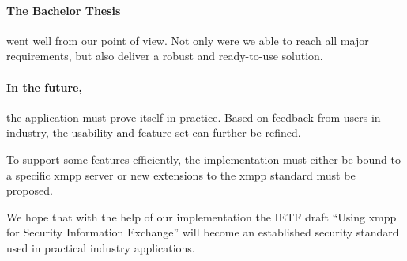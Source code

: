 \paragraph{The Bachelor Thesis} went well from our point of view.
Not only were we able to reach all major requirements, but also deliver a robust and ready-to-use solution.

\paragraph{In the future,} the application must prove itself in practice.
Based on feedback from users in industry, the usability and feature set can further be refined.

To support some features efficiently, the implementation must either be bound to a specific \gls{xmpp} server or new extensions to the \gls{xmpp} standard must be proposed.

We hope that with the help of our implementation the IETF draft ``Using \gls{xmpp} for Security Information Exchange'' will become an established security standard used in practical industry applications.
\label{lastpage} %